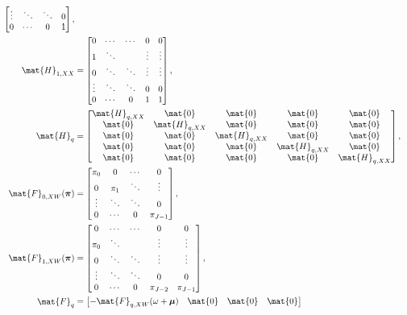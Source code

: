 \documentclass{jpmarticle}
\renewcommand{\vec}[1]{\boldsymbol{\mathrm{#1}}}
\let\subequationsorig\subequations%
\let\endsubequationsorig\endsubequations%
\renewenvironment{subequations}{
  \subequationsorig
  \renewcommand{\theequation}{\theparentequation.\arabic{equation}}
}{
  \endsubequationsorig
}
\begin{document}
\begin{subequations}
\begin{align}
\begin{bmatrix}
      \vdots & \ddots & \ddots & 0 \\
      0 & \cdots & 0 & 1
    \end{bmatrix},
    \\
    \mat{H}_{1, XX} &=
    \begin{bmatrix}
      0 & \cdots & \cdots & 0 & 0 \\
      1 & \ddots & & \vdots & \vdots \\
      0 & \ddots & \ddots & \vdots & \vdots \\
      \vdots & \ddots & \ddots & 0 & 0 \\
      0 & \cdots & 0 & 1 & 1
    \end{bmatrix},
    \\
    \mat{H}_{q} &=
    \begin{bmatrix}
      \mat{H}_{q, XX} & \mat{0} & \mat{0} & \mat{0} & \mat{0} \\
      \mat{0} & \mat{H}_{q, XX} & \mat{0} & \mat{0} & \mat{0} \\
      \mat{0} & \mat{0} & \mat{H}_{q, XX} & \mat{0} & \mat{0} \\
      \mat{0} & \mat{0} & \mat{0} & \mat{H}_{q, XX} & \mat{0}
      \\
      \mat{0} & \mat{0} & \mat{0} & \mat{0} & \mat{H}_{q, XX}
    \end{bmatrix},
    \\
    \mat{F}_{0, XW}(\vec{\pi}) &=
    \begin{bmatrix}
      \pi_0 & 0 & \cdots & 0 \\
      0 & \pi_1 & \ddots & \vdots \\
      \vdots & \ddots & \ddots & 0 \\
      0 & \cdots & 0 & \pi_{J - 1}
    \end{bmatrix},
    \\
    \mat{F}_{1, XW}(\vec{\pi}) &=
    \begin{bmatrix}
      0 & \cdots & \cdots & 0 & 0 \\
      \pi_0 & \ddots & & \vdots & \vdots \\
      0 & \ddots & \ddots & \vdots & \vdots \\
      \vdots & \ddots & \ddots & 0 & 0 \\
      0 & \cdots & 0 & \pi_{J - 2} & \pi_{J - 1}
    \end{bmatrix},
    \\
    \mat{F}_q &=
    \begin{bmatrix}
      - \mat{F}_{q, XW}(\omega + \vec{\mu}) & \mat{0} & \mat{0} & \mat{0}

\end{bmatrix}
\end{align}
\end{subequations}
\end{document}
